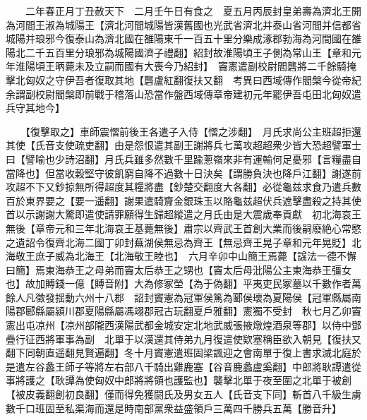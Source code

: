 　　二年春正月丁丑赦天下　二月壬午日有食之　夏五月丙辰封皇弟壽為濟北王開為河間王淑為城陽王【濟北河間城陽皆漢舊國也光武省濟北并泰山省河間并信都省城陽并琅邪今復泰山為濟北國在雒陽東千一百五十里分樂成涿郡勃海為河間國在雒陽北二千五百里分琅邪為城陽國濟子禮翻】紹封故淮陽頃王子側為常山王【章和元年淮陽頃王昞薨未及立嗣而國有大喪今乃紹封】　竇憲遣副校尉閻礱將二千餘騎掩擊北匈奴之守伊吾者復取其地【礱盧紅翻復扶又翻　考異曰西域傳作閻槃今從帝紀余謂副校尉閻槃即前戰于稽落山恐當作盤西域傳章帝建初元年罷伊吾屯田北匈奴遣兵守其地今】

　　【復擊取之】車師震慴前後王各遣子入侍【慴之涉翻】　月氏求尚公主班超拒還其使【氏音支使疏吏翻】由是怨恨遣其副王謝將兵七萬攻超超衆少皆大恐超譬軍士曰【譬喻也少詩沼翻】月氏兵雖多然數千里踰蔥嶺來非有運輸何足憂邪【言糧盡自當降也】但當收穀堅守彼飢窮自降不過數十日決矣【謂勝負決也降戶江翻】謝遂前攻超不下又鈔掠無所得超度其糧將盡【鈔楚交翻度大各翻】必從龜兹求食乃遣兵數百於東界要之【要一遥翻】謝果遣騎齎金銀珠玉以賂龜兹超伏兵遮擊盡殺之持其使首以示謝謝大驚即遣使請罪願得生歸超縱遣之月氏由是大震歲奉貢獻　初北海哀王無後【章帝元和三年北海哀王基薨無後】肅宗以齊武王首創大業而後嗣廢絶心常愍之遺詔令復齊北海二國丁卯封蕪湖侯無忌為齊王【無忌齊王晃子章和元年晃貶】北海敬王庶子威為北海王【北海敬王睦也】　六月辛卯中山簡王焉薨【諡法一德不懈曰簡】焉東海恭王之母弟而竇太后恭王之甥也【竇太后母沘陽公主東海恭王彊女也】故加賻錢一億【賻音附】大為修冢塋【為于偽翻】平夷吏民冢墓以千數作者萬餘人凡徵發揺動六州十八郡　詔封竇憲為冠軍侯篤為郾侯瓌為夏陽侯【冠軍縣屬南陽郡郾縣屬潁川郡夏陽縣屬馮翊郡冠古玩翻夏戶雅翻】憲獨不受封　秋七月乙卯竇憲出屯凉州【凉州部隴西漢陽武都金城安定北地武威張掖燉煌酒泉等郡】以侍中鄧疊行征西將軍事為副　北單于以漢還其侍弟九月復遣使欵塞稱臣欲入朝見【復扶又翻下同朝直遥翻見賢遍翻】冬十月竇憲遣班固梁諷迎之會南單于復上書求滅北庭於是遣左谷蠡王師子等將左右部八千騎出雞鹿塞【谷音鹿蠡盧奚翻】中郎將耿譚遣從事將護之【耿譚為使匈奴中郎將將領也護監也】襲擊北單于夜至圍之北單于被創【被皮義翻創初良翻】僅而得免獲閼氏及男女五人【氏音支下同】斬首八千級生虜數千口班固至私渠海而還是時南部黨衆益盛領戶三萬四千勝兵五萬【勝音升】

